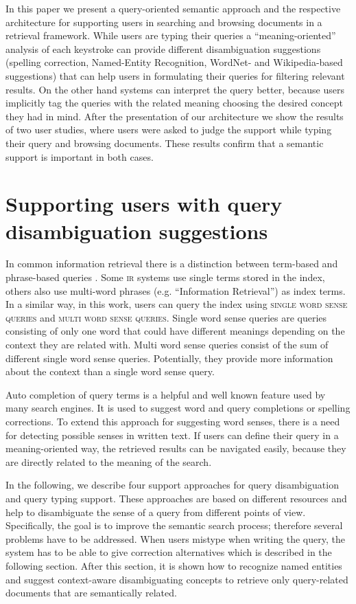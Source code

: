 \documentclass[output=paper]{LSP/langsci}
\begin{document}
In this paper we present a query-oriented semantic approach and the respective architecture for supporting users in searching and browsing documents in a retrieval framework. While users are typing their queries a ``meaning-oriented'' analysis of each keystroke can provide different disambiguation suggestions (spelling correction, Named-Entity Recognition, WordNet- and Wikipedia-based suggestions) that can help users in formulating their queries for filtering relevant results. On the other hand systems can interpret the query better, because users implicitly tag the queries with the related meaning choosing the desired concept they had in mind. After the presentation of our architecture we show the results of two user studies, where users were asked to judge the support while typing their query and browsing documents. These results confirm that a semantic support is important in both cases.


\section{Supporting users with query disambiguation suggestions}
\label{sec:app_ss}
In common information retrieval there is a distinction between term-based and phrase-based queries \citet{Singhal01}. Some \textsc{ir} systems use single terms stored in the index, others also use multi-word phrases (e.g. ``Information Retrieval'') as index terms. In a similar way, in this work, users can query the index using \textsc{single word sense queries} and \textsc{multi word sense queries}. {Single word sense queries} are queries consisting of only one word that could have different meanings depending on the context they are related with. Multi word sense queries consist of the sum of different single word sense queries. Potentially, they provide more information about the context than a single word sense query. 

Auto completion of query terms is a helpful and well known feature used by many search engines. It is used to suggest word and query completions or spelling corrections. To extend this approach for suggesting word senses, there is a need for detecting possible senses in written text. If users can define their query in a meaning-oriented way, the retrieved results can be navigated easily, because they are directly related to the meaning of the search.

In the following, we describe four support approaches for query disambiguation and query typing support. These approaches are based on different resources and help to disambiguate the sense of a query from different points of view. Specifically, the goal is to improve the semantic search process; therefore several problems have to be addressed. When users mistype when writing the query, the system has to be able to give correction alternatives which is described in the following section. After this section, it is shown how to recognize named entities and suggest context-aware disambiguating concepts to retrieve only query-related documents that are semantically related.
\end{document}
